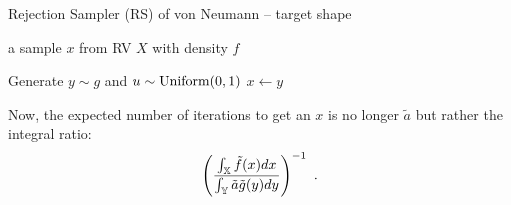 \begin{algorithm}
\caption{Rejection Sampler (RS) of von Neumann -- target shape}
\label{A:RS2}
\begin{algorithmic}[1]
 a sample $x$ from RV $X$ with density $f$

\REPEAT
\STATE Generate $y \sim g$ and $u \sim \mbox{{\rm Uniform}}(0,1)$
 $x \gets y$
\end{algorithmic}
\end{algorithm}
Now, the expected number of iterations to get an $x$ is no longer $\tilde{a}$ but rather the integral ratio: $$ \left( \frac{\int_{\mathbb{X}} \tilde{f}(x) dx }{\int_{\mathbb{Y}} \tilde{a} \tilde{g}(y) dy} \right)^{-1} \ .$$

%


